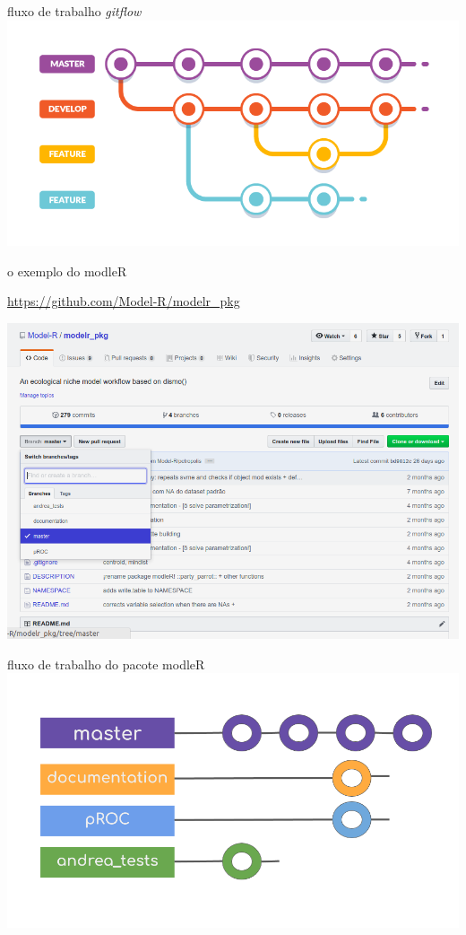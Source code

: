 \documentclass[11pt]{beamer}
\begin{document}
\begin{frame}{fluxo de trabalho \textit{gitflow}}
\includegraphics[scale=.4]{gitflow.png}
\end{frame}

\begin{frame}{o exemplo do modleR}

\href{https://github.com/Model-R/modelr_pkg}{https://github.com/Model-R/modelr\_pkg}


\includegraphics[scale=.3]{print1.png}

\end{frame}


\begin{frame}{fluxo de trabalho do pacote modleR}
\includegraphics[scale=.3]{git.png}
\end{frame}
\end{document}
